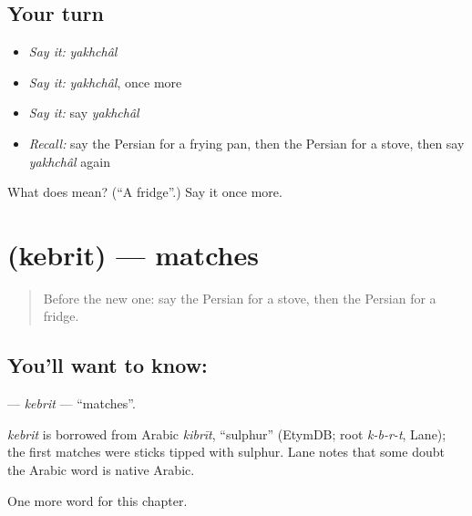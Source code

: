 \subsection*{Your turn}
\begin{itemize}
\raggedright
  \item \emph{Say it:} \emph{yakhchâl}
  \item \emph{Say it:} \emph{yakhchâl}, once more
  \item \emph{Say it:} say \emph{yakhchâl}
  \item \emph{Recall:} say the Persian for a frying pan, then the Persian for a stove, then say \emph{yakhchâl} again
\end{itemize}

\begin{tcolorbox}[breakable,colback=teal!4,colframe=teal!35!black,title={Before you move on}]
What does  mean? (\textquotedblleft{}A fridge\textquotedblright{}.) Say it once more.
\end{tcolorbox}
\section[\texorpdfstring{\fa{کبریت} (kebrit)}{کبریت (kebrit)}]{ (kebrit) — matches}

\label{lesson:FA-C96-kebrit}



\begin{quote}
Before the new one: say the Persian for a stove, then the Persian for a fridge.
\end{quote}

\subsection*{You'll want to know: }
\textbf{} — \emph{kebrit} — \textquotedblleft{}matches\textquotedblright{}.

\begin{cousinweb}
\emph{kebrit} is borrowed from Arabic \emph{kibrīt}, \textquotedblleft{}sulphur\textquotedblright{} (EtymDB; root \emph{k-b-r-t}, Lane); the first matches were sticks tipped with sulphur. Lane notes that some doubt the Arabic word is native Arabic.
\end{cousinweb}

\begin{grammarlens}[title={What you've built}]
One more word for this chapter.
\end{grammarlens}

